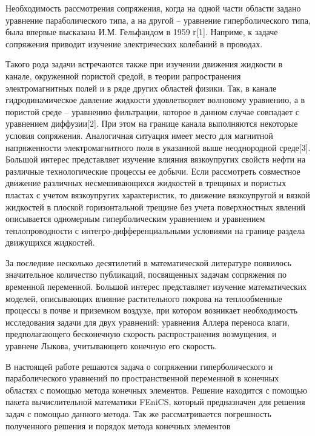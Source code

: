 \newpage

\begin{center}
\end{center}

Необходимость рассмотрения сопряжения, когда на одной части области задано уравнение параболического типа, а на другой -- уравнение гиперболического типа, была впервые высказана И.М. Гельфандом в 1959 г[1]. Наприме, к задаче сопряжения приводит изучение электрических колебаний в проводах.

Такого рода задачи встречаются также при изучении движения жидкости в канале, окруженной пористой средой, в теории рапространения электромагнитных полей и в ряде других областей физики. Так, в канале гидродинамическое давление жидкости удовлетворяет волновому уравнению, а в пористой среде -- уравнению фильтрации, которое в данном случае совпадает с уравнением диффузии[2]. При этом на границе канала выполняются некоторые условия сопряжения. Аналогичная ситуация имеет место для магнитной напряженности электромагнитного поля в указанной выше неоднородной среде[3]. Большой интерес представляет изучение влияния вязкоупругих свойств нефти на различные технологические процессы ее добычи. Если рассмотреть совместное движение различных несмешивающихся жидкостей в трещинах и пористых пластах с учетом вязкоупругих характеристик, то движение вязкоупругой и вязкой жидкостей в плоской горизонтальной трещине без учета поверхностных явлений описывается одномерным гиперболическим уравнением и уравнением теплопроводности с интегро-дифференциальными условиями на границе раздела движущихся жидкостей.

За последние несколько десятилетий в математической литературе появилось значительное количество публикаций, посвященных задачам сопряжения по временной переменной.
Большой интерес представляет изучение математических моделей, описывающих влияние растительного покрова на теплообменные процессы в почве и приземном воздухе, при котором возникает необходимость исследования задачи для двух уравнений: уравнения Аллера переноса влаги, предполагающего бесконечную скорость распространения возмущения, и уравнене Лыкова, учитывающего конечную его скорость.


В настоящей работе решаются задача о сопряжении гиперболического и параболического уравнений
по пространственной переменной в конечных областях с помощью метода конечных элементов.
Решение находится с помощью пакета вычислительной математики FEniCS, который предназначен для решения задач с помощью данного метода.
Так же рассматривается погрешность полученного решения и порядок метода конечных элементов


\newpage
